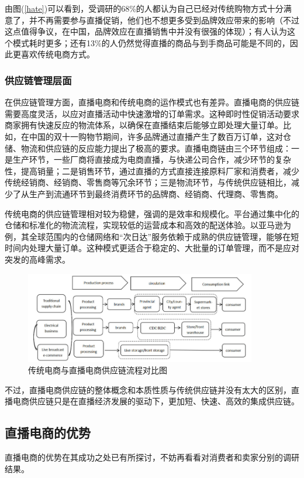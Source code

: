 \documentclass[12pt]{ctexart}
\begin{document}
由图(\ref{hate})可以看到，受调研的68\%的人都认为自己已经对传统购物方式十分满意了，并不再需要参与直播促销，他们也不想更多受到品牌效应带来的影响（不过这点值得争议，在中国，品牌效应在直播销售中并没有很强的体现）；有人认为这个模式耗时更多；还有13\%的人仍然觉得直播的商品与到手商品可能是不同的，因此更喜欢传统电商方式。

\subsubsection{供应链管理层面}
在供应链管理方面，直播电商和传统电商的运作模式也有差异。直播电商的供应链需要高度灵活，以应对直播活动中快速激增的订单需求。这种即时性促销活动要求商家拥有快速反应的物流体系，以确保在直播结束后能够立即处理大量订单。比如，在中国的双十一购物节期间，许多品牌通过直播产生了数百万订单，这对仓储、物流和供应链的反应能力提出了极高的要求。直播电商链由三个环节组成：一是生产环节，一些厂商将直接成为电商直播，与快递公司合作，减少环节的复杂性，提高销量；二是销售环节，通过直播的方式直接连接原料厂家和消费者，减少传统经销商、经销商、零售商等冗余环节；三是物流环节，与传统供应链相比，减少了从生产到流通环节到最终消费环节的品牌商、经销商、代理商、零售商\cite{22}。

传统电商的供应链管理相对较为稳健，强调的是效率和规模化。平台通过集中化的仓储和标准化的物流流程，实现较低的运营成本和高效的配送体验。以亚马逊为例，其全球范围内的仓储网络和“次日达”服务依赖于成熟的供应链管理，能够在短时间内处理大量订单。这种模式更适合于稳定的、大批量的订单管理，而不是应对突发的高峰需求。

\begin{figure}[htbp!]
    \centering
    \includegraphics[width=0.9\textwidth]{Images/18.png}
    \caption{传统电商与直播电商供应链流程对比图 \cite{22}}
    \label{diag}
\end{figure}

不过，直播电商供应链的整体概念和本质性质与传统供应链并没有太大的区别，直播电商供应链只是在直播经济发展的驱动下，更加短、快速、高效的集成供应链\cite{22}。


\subsection{直播电商的优势}
直播电商的优势在其成功之处已有所探讨，不妨再看看对消费者和卖家分别的调研结果。
\end{document}

